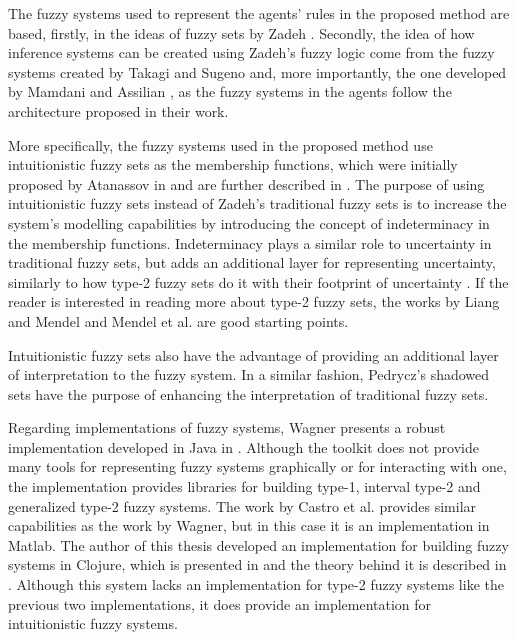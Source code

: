 The fuzzy systems used to represent the agents' rules in the proposed method are
based, firstly, in the ideas of fuzzy sets by Zadeh \cite{Zadeh1965}. Secondly,
the idea of how inference systems can be created using Zadeh's fuzzy logic come
from the fuzzy systems created by Takagi and Sugeno \cite{Takagi1985} and, more
importantly, the one developed by Mamdani and Assilian \cite{Mamdani1975}, as
the fuzzy systems in the agents follow the architecture proposed in their work.

More specifically, the fuzzy systems used in the proposed method use
intuitionistic fuzzy sets as the membership functions, which were initially
proposed by Atanassov in \cite{Atanassov1986} and are further described in
\cite{Atanassov2003}. The purpose of using intuitionistic fuzzy sets instead of
Zadeh's traditional fuzzy sets is to increase the system's modelling
capabilities by introducing the concept of indeterminacy in the membership
functions. Indeterminacy plays a similar role to uncertainty in traditional
fuzzy sets, but adds an additional layer for representing uncertainty, similarly
to how type-2 fuzzy sets do it with their footprint of uncertainty
\cite{Mendel2002} \cite{Karnik2001}. If the reader is interested in reading more
about type-2 fuzzy sets, the works by Liang and Mendel \cite{Liang2000} and
Mendel et al. \cite{Mendel2006} are good starting points.

Intuitionistic fuzzy sets also have the advantage of providing an additional
layer of interpretation to the fuzzy system. In a similar fashion, Pedrycz's
shadowed sets \cite{Pedrycz1998} have the purpose of enhancing the
interpretation of traditional fuzzy sets.

Regarding implementations of fuzzy systems, Wagner presents a robust
implementation developed in Java in \cite{Wagner2013}. Although the toolkit does
not provide many tools for representing fuzzy systems graphically or for
interacting with one, the implementation provides libraries for building type-1,
interval type-2 and generalized type-2 fuzzy systems. The work by Castro et
al. \cite{castro2007interval} provides similar capabilities as the work by
Wagner, but in this case it is an implementation in Matlab. The author of this
thesis developed an implementation for building fuzzy systems in Clojure, which
is presented in \cite{Hernandez-Aguila2017} and the theory behind it is
described in \cite{Hernandez-aguila2016}. Although this system lacks an
implementation for type-2 fuzzy systems like the previous two implementations,
it does provide an implementation for intuitionistic fuzzy systems.

